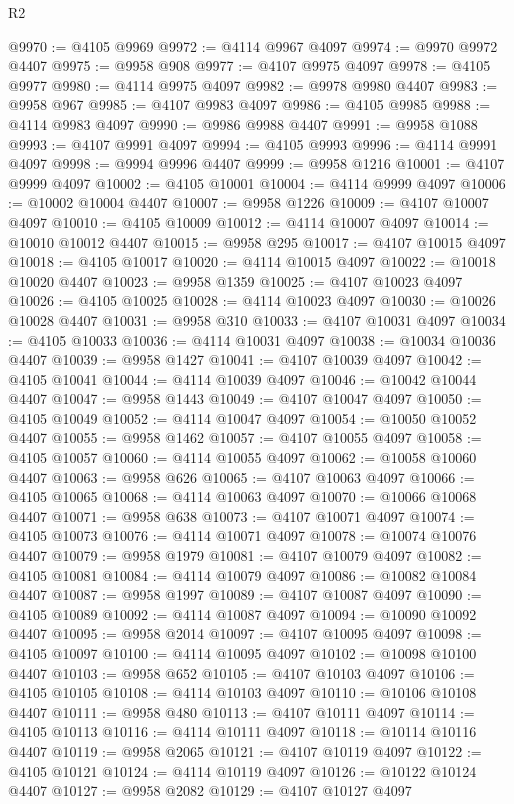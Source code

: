 \begin{lexlean}{R2}
\begin{coremodule}
@9970 := @4105 @9969
@9972 := @4114 @9967 @4097
@9974 := @9970 @9972 @4407
@9975 := @9958 @908
@9977 := @4107 @9975 @4097
@9978 := @4105 @9977
@9980 := @4114 @9975 @4097
@9982 := @9978 @9980 @4407
@9983 := @9958 @967
@9985 := @4107 @9983 @4097
@9986 := @4105 @9985
@9988 := @4114 @9983 @4097
@9990 := @9986 @9988 @4407
@9991 := @9958 @1088
@9993 := @4107 @9991 @4097
@9994 := @4105 @9993
@9996 := @4114 @9991 @4097
@9998 := @9994 @9996 @4407
@9999 := @9958 @1216
@10001 := @4107 @9999 @4097
@10002 := @4105 @10001
@10004 := @4114 @9999 @4097
@10006 := @10002 @10004 @4407
@10007 := @9958 @1226
@10009 := @4107 @10007 @4097
@10010 := @4105 @10009
@10012 := @4114 @10007 @4097
@10014 := @10010 @10012 @4407
@10015 := @9958 @295
@10017 := @4107 @10015 @4097
@10018 := @4105 @10017
@10020 := @4114 @10015 @4097
@10022 := @10018 @10020 @4407
@10023 := @9958 @1359
@10025 := @4107 @10023 @4097
@10026 := @4105 @10025
@10028 := @4114 @10023 @4097
@10030 := @10026 @10028 @4407
@10031 := @9958 @310
@10033 := @4107 @10031 @4097
@10034 := @4105 @10033
@10036 := @4114 @10031 @4097
@10038 := @10034 @10036 @4407
@10039 := @9958 @1427
@10041 := @4107 @10039 @4097
@10042 := @4105 @10041
@10044 := @4114 @10039 @4097
@10046 := @10042 @10044 @4407
@10047 := @9958 @1443
@10049 := @4107 @10047 @4097
@10050 := @4105 @10049
@10052 := @4114 @10047 @4097
@10054 := @10050 @10052 @4407
@10055 := @9958 @1462
@10057 := @4107 @10055 @4097
@10058 := @4105 @10057
@10060 := @4114 @10055 @4097
@10062 := @10058 @10060 @4407
@10063 := @9958 @626
@10065 := @4107 @10063 @4097
@10066 := @4105 @10065
@10068 := @4114 @10063 @4097
@10070 := @10066 @10068 @4407
@10071 := @9958 @638
@10073 := @4107 @10071 @4097
@10074 := @4105 @10073
@10076 := @4114 @10071 @4097
@10078 := @10074 @10076 @4407
@10079 := @9958 @1979
@10081 := @4107 @10079 @4097
@10082 := @4105 @10081
@10084 := @4114 @10079 @4097
@10086 := @10082 @10084 @4407
@10087 := @9958 @1997
@10089 := @4107 @10087 @4097
@10090 := @4105 @10089
@10092 := @4114 @10087 @4097
@10094 := @10090 @10092 @4407
@10095 := @9958 @2014
@10097 := @4107 @10095 @4097
@10098 := @4105 @10097
@10100 := @4114 @10095 @4097
@10102 := @10098 @10100 @4407
@10103 := @9958 @652
@10105 := @4107 @10103 @4097
@10106 := @4105 @10105
@10108 := @4114 @10103 @4097
@10110 := @10106 @10108 @4407
@10111 := @9958 @480
@10113 := @4107 @10111 @4097
@10114 := @4105 @10113
@10116 := @4114 @10111 @4097
@10118 := @10114 @10116 @4407
@10119 := @9958 @2065
@10121 := @4107 @10119 @4097
@10122 := @4105 @10121
@10124 := @4114 @10119 @4097
@10126 := @10122 @10124 @4407
@10127 := @9958 @2082
@10129 := @4107 @10127 @4097

\end{coremodule}
\end{lexlean}
